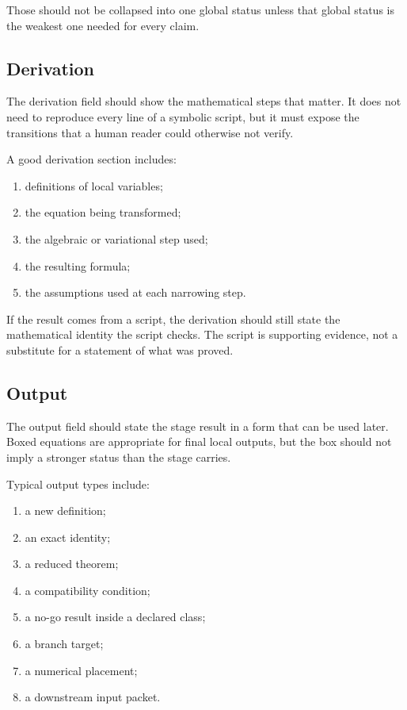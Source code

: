 Those should not be collapsed into one global status unless that global status is the weakest one needed for every claim.

\subsection{Derivation}
\label{subsec:stage-derivation}

The derivation field should show the mathematical steps that matter.  It does not need to reproduce every line of a symbolic script, but it must expose the transitions that a human reader could otherwise not verify.

A good derivation section includes:
\begin{enumerate}[leftmargin=2.2em]
  \item definitions of local variables;
  \item the equation being transformed;
  \item the algebraic or variational step used;
  \item the resulting formula;
  \item the assumptions used at each narrowing step.
\end{enumerate}

If the result comes from a script, the derivation should still state the mathematical identity the script checks.  The script is supporting evidence, not a substitute for a statement of what was proved.

\subsection{Output}
\label{subsec:stage-output}

The output field should state the stage result in a form that can be used later.  Boxed equations are appropriate for final local outputs, but the box should not imply a stronger status than the stage carries.

Typical output types include:
\begin{enumerate}[leftmargin=2.2em]
  \item a new definition;
  \item an exact identity;
  \item a reduced theorem;
  \item a compatibility condition;
  \item a no-go result inside a declared class;
  \item a branch target;
  \item a numerical placement;
  \item a downstream input packet.
\end{enumerate}

